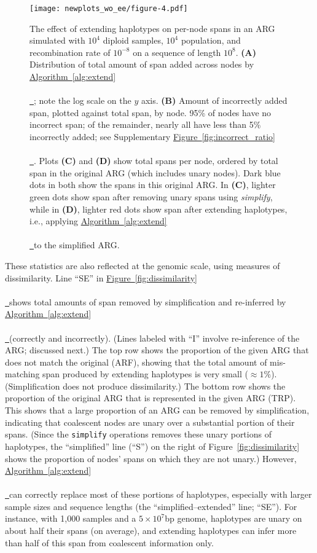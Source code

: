 \documentclass[10pt,twoside,lineno]{gsajnl}
\newcommand{\algorithmref}[2][]{%
	\hyperref[{#2}]{%
		Algorithm~\ref*{#2}%
		\ifx\\#1\\%
		\else
		\,#1%
		\fi
	}%
}
\newcommand*{\figref}[2][]{%
	\hyperref[{#2}]{%
		Figure~\ref*{#2}%
		\ifx\\#1\\%
		\else
		\,#1%
		\fi
	}%
}
\begin{document}
\begin{figure}[!bht]
	\texttt{[image: newplots\_wo\_ee/figure-4.pdf]}
	\caption{
        The effect of extending haplotypes on per-node spans
        in an ARG simulated with $10^4$ diploid samples, $10^4$ population, and 
        recombination rate of $10^{-8}$ on a sequence of length $10^8$.
        \textbf{(A)}
        Distribution of total amount of span added across nodes by \algorithmref{alg:extend};
        note the log scale on the $y$ axis.
        \textbf{(B)}
        Amount of incorrectly added span, plotted against total span, by node.
        95\% of nodes have no incorrect span; of the remainder,
        nearly all have less than 5\% incorrectly added;
        see Supplementary \figref{fig:incorrect_ratio}.
        Plots \textbf{(C)} and \textbf{(D)} show total spans per node,
        ordered by total span in the original ARG (which includes unary nodes).
        Dark blue dots in both show the spans in this original ARG.
        In \textbf{(C)}, lighter green dots show
        span after removing unary spans using \textit{simplify},
        while in \textbf{(D)},
        lighter red dots show span after extending haplotypes,
        i.e., applying \algorithmref{alg:extend} to the simplified ARG.
    }
	\label{fig:node-spans}
\end{figure}

These statistics are also reflected at the genomic scale, using measures of dissimilarity.
Line ``SE'' in \figref{fig:dissimilarity} shows total amounts of span removed by simplification
and re-inferred by \algorithmref{alg:extend} (correctly and incorrectly).
(Lines labeled with ``I'' involve re-inference of the ARG; discussed next.)
The top row shows the proportion of the given ARG that does not match the original (ARF),
showing that the total amount of mis-matching span
produced by extending haplotypes is very small ($\approx 1\%$).
(Simplification does not produce dissimilarity.)
The bottom row shows the proportion of the original ARG that is represented in the given ARG (TRP).
This shows that a large proportion of an ARG can be removed by simplification,
indicating that coalescent nodes are unary
over a substantial portion of their spans.
(Since the \texttt{simplify} operations removes these unary portions of haplotypes,
the ``simplified'' line (``S'') on the right of Figure~\ref{fig:dissimilarity} shows
the proportion of nodes' spans on which they are not unary.)
However, \algorithmref{alg:extend} can correctly replace most of these portions of haplotypes,
especially with larger sample sizes and sequence lengths
(the ``simplified--extended'' line; ``SE'').
For instance, with 1,000 samples and a $5 \times 10^7$bp genome,
haplotypes are unary on about half their spans (on average),
and extending haplotypes can infer more than half of this span from coalescent information only.
\end{document}

